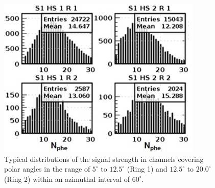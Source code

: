\begin{figure}[!ht]
    \centering
    \includegraphics[width=1.0\linewidth,trim={0.0cm 0.0cm 0.0cm 0.0cm},clip]{images/Signal_S1_HS1_HS2_R1_R2.jpg}
    \caption{Typical distributions of the signal strength in channels covering polar angles in the range of $5^\circ$ to
      $12.5^\circ$ (Ring 1) and $12.5^\circ$ to $20.0^\circ$ (Ring 2) within an azimuthal interval of $60^\circ$.}
    \label{fig:Signal_S1_HS1_HS2_R1_R2}
\end{figure}

